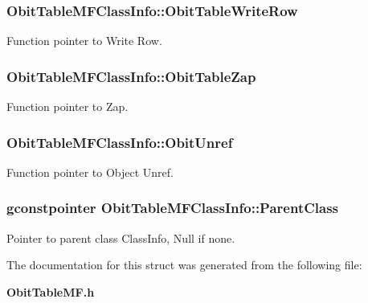 \subsubsection{ {\bf Obit\-Table\-MFClass\-Info::Obit\-Table\-Write\-Row}}\label{structObitTableMFClassInfo_o26}


Function pointer to Write Row. 

\subsubsection{ {\bf Obit\-Table\-MFClass\-Info::Obit\-Table\-Zap}}\label{structObitTableMFClassInfo_o19}


Function pointer to Zap. 

\subsubsection{ {\bf Obit\-Table\-MFClass\-Info::Obit\-Unref}}\label{structObitTableMFClassInfo_o11}


Function pointer to Object Unref. 

\subsubsection{\setlength{\rightskip}{0pt plus 5cm}gconstpointer {\bf Obit\-Table\-MFClass\-Info::Parent\-Class}}\label{structObitTableMFClassInfo_o3}


Pointer to parent class Class\-Info, Null if none. 



The documentation for this struct was generated from the following file:\begin{CompactItemize}
\item 
{\bf Obit\-Table\-MF.h}\end{CompactItemize}
